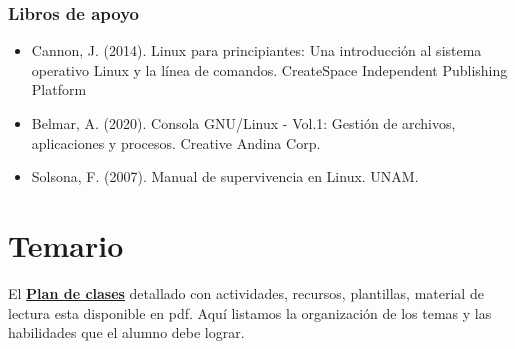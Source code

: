 \documentclass[
  spanish,
  12pt,
  letterpaper,
  DIV=11,
  numbers=noendperiod]{scrreprt}
\providecommand{\tightlist}{%
  \setlength{\itemsep}{0pt}\setlength{\parskip}{0pt}}
\begin{document}
\subsection*{Libros de apoyo}\label{libros-de-apoyo}

\begin{itemize}
\tightlist
\item
  Cannon, J. (2014). Linux para principiantes: Una introducción al
  sistema operativo Linux y la línea de comandos. CreateSpace
  Independent Publishing Platform
\item
  Belmar, A. (2020). Consola GNU/Linux - Vol.1: Gestión de archivos,
  aplicaciones y procesos. Creative Andina Corp.
\item
  Solsona, F. (2007). Manual de supervivencia en Linux. UNAM.
\end{itemize}


\chapter*{Temario}\label{temario}


El
\href{https://docs.google.com/document/d/17rDksWqGWQqDFUMFqzgVF_BXnBDP3KMUrysgxIPGv9U/edit?usp=sharing}{\textbf{Plan
de clases}} detallado con actividades, recursos, plantillas, material de
lectura esta disponible en pdf. Aquí listamos la organización de los
temas y las habilidades que el alumno debe lograr.
\end{document}
